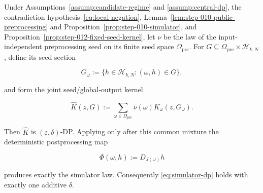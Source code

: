 \begin{lemma}\label{lem:step-012-postprocess-mixture}
Under Assumptions~\ref{assump:candidate-regime} and
\ref{assump:central-dp}, the contradiction hypothesis~\eqref{eq:local-negation}, Lemma~\ref{lem:step-010-public-preprocessing} and
Proposition~\ref{prop:step-010-simulator}, and
Proposition~\ref{prop:step-012-fixed-seed-kernel}, let \(\nu\) be the law
of the input-independent preprocessing seed on its finite seed space
\(\mathsf\Omega_{\mathrm{pre}}\).  For
\(G\subseteq\mathsf\Omega_{\mathrm{pre}}\times\mathcal H_{k,N}\), define
its seed section

\[
  G_\omega:=\{h\in\mathcal H_{k,N}:(\omega,h)\in G\},
\tag{S12.20}\label{eq:step-012-20}
\]

and form the joint seed/global-output kernel

\[
  \widehat K(z,G)
  :=\sum_{\omega\in\mathsf\Omega_{\mathrm{pre}}}
       \nu(\omega)K_\omega(z,G_\omega).
\tag{S12.21}\label{eq:step-012-21}
\]

Then \(\widehat K\) is \((\varepsilon,\delta)\)-DP.  Applying only after
this common mixture the deterministic postprocessing map

\[
  \Phi(\omega,h):=D_{J(\omega)}h
\tag{S12.22}\label{eq:step-012-22}
\]

produces exactly the simulator law.  Consequently \eqref{eq:simulator-dp} holds with
exactly one additive \(\delta\).
\end{lemma}

